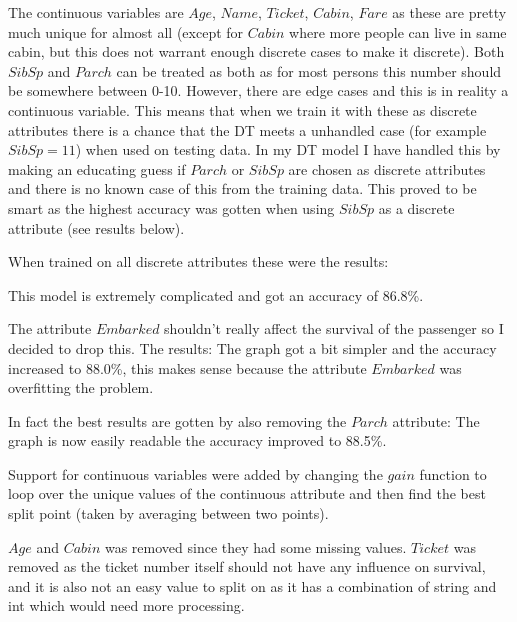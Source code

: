 \documentclass[11pt, english]{../Template/NTNUoving}
\begin{document}
\begin{oppgave}
    \begin{punkt}
        The continuous variables are $Age$, $Name$, $Ticket$, $Cabin$, $Fare$ as these are pretty much
        unique for almost all (except for $Cabin$ where more people can live in same cabin, but this does not warrant enough discrete cases to make it discrete). Both $SibSp$ and $Parch$ can be treated as
        both as for most persons this number should be somewhere between 0-10. However, there are edge cases and this is in reality a continuous variable. This means that when we train it
        with these as discrete attributes there is a chance that the DT meets a unhandled case (for example $SibSp = 11$) when used on testing data.
        In my DT model I have handled this by making an educating guess if $Parch$ or $SibSp$ are chosen as discrete attributes and there is no known case of this from the
        training data. This proved to be smart as the highest accuracy was gotten when using $SibSp$ as a discrete attribute (see results below).

        When trained on all discrete attributes these were the results:
        \clearpage

        This model is extremely complicated and got an accuracy of 86.8\%.

        The attribute $Embarked$ shouldn't really affect the survival of the passenger so I decided to drop this. The results:
        \clearpage
        The graph got a bit simpler and the accuracy increased to 88.0\%, this makes sense because
        the attribute $Embarked$ was overfitting the problem.

        In fact the best results are gotten by also removing the $Parch$ attribute:
        \clearpage
        The graph is now easily readable the accuracy improved to 88.5\%.

    \end{punkt}

    \begin{punkt}
        Support for continuous variables were added by changing the $gain$ function to
        loop over the unique values of the continuous attribute and then find the best split point (taken by averaging between two points).

        $Age$ and $Cabin$ was removed since they had some missing values. $Ticket$ was removed as the ticket number itself should not have
        any influence on survival, and it is also not an easy value to split on as it has a combination of string and int which would need more processing.


\end{punkt}
\end{oppgave}
\end{document}
